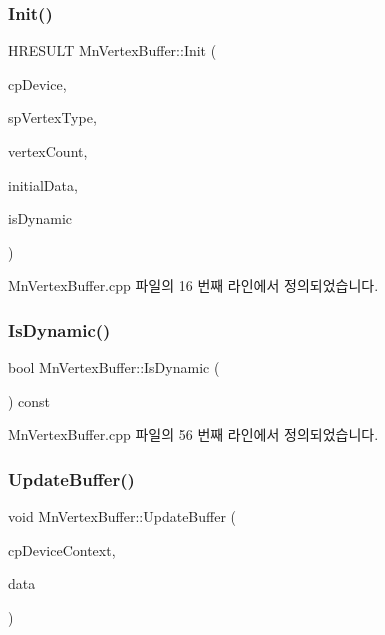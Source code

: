 \subsubsection{\texorpdfstring{Init()}{Init()}}
{\footnotesize\ttfamily H\+R\+E\+S\+U\+LT Mn\+Vertex\+Buffer\+::\+Init (\begin{DoxyParamCaption}\item[{\hyperlink{namespace_m_n_l_a1eec210db8f309a4a9ac0d9658784c31}{C\+P\+D3\+D\+Device}}]{cp\+Device,  }\item[{const std\+::shared\+\_\+ptr$<$ \hyperlink{class_m_n_l_1_1_mn_custom_vertex_type}{Mn\+Custom\+Vertex\+Type} $>$ \&}]{sp\+Vertex\+Type,  }\item[{U\+I\+NT}]{vertex\+Count,  }\item[{const D3\+D11\+\_\+\+S\+U\+B\+R\+E\+S\+O\+U\+R\+C\+E\+\_\+\+D\+A\+TA $\ast$}]{initial\+Data,  }\item[{bool}]{is\+Dynamic }\end{DoxyParamCaption})}



Mn\+Vertex\+Buffer.\+cpp 파일의 16 번째 라인에서 정의되었습니다.

\mbox{\label{class_m_n_l_1_1_mn_vertex_buffer_aebc750ff8566b4ac34bd3c741559871a}} 
\subsubsection{\texorpdfstring{Is\+Dynamic()}{IsDynamic()}}
{\footnotesize\ttfamily bool Mn\+Vertex\+Buffer\+::\+Is\+Dynamic (\begin{DoxyParamCaption}{ }\end{DoxyParamCaption}) const}



Mn\+Vertex\+Buffer.\+cpp 파일의 56 번째 라인에서 정의되었습니다.

\mbox{\label{class_m_n_l_1_1_mn_vertex_buffer_abf79f766df9f9df7850fded4c3f714c8}} 
\subsubsection{\texorpdfstring{Update\+Buffer()}{UpdateBuffer()}}
{\footnotesize\ttfamily void Mn\+Vertex\+Buffer\+::\+Update\+Buffer (\begin{DoxyParamCaption}\item[{\hyperlink{namespace_m_n_l_aab3aabb6c9360e44ddc8b0bb563c2107}{C\+P\+D3\+D\+Device\+Context}}]{cp\+Device\+Context,  }\item[{const D3\+D11\+\_\+\+S\+U\+B\+R\+E\+S\+O\+U\+R\+C\+E\+\_\+\+D\+A\+TA \&}]{data }\end{DoxyParamCaption})}




